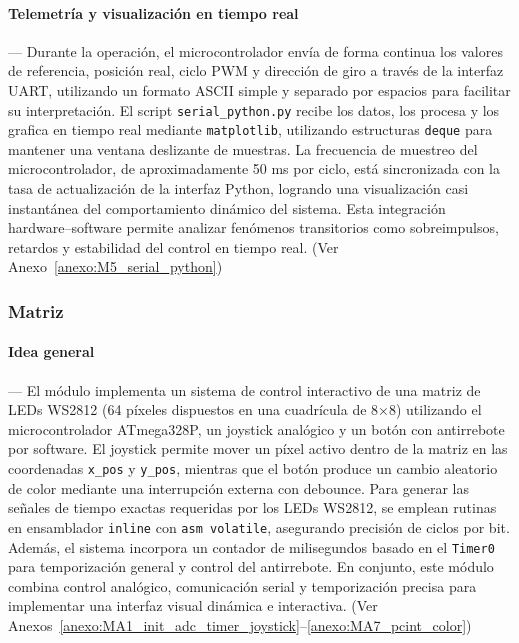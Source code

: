 \vspace{1em}

\paragraph*{\textbf{Telemetría y visualización en tiempo real}}---
Durante la operación, el microcontrolador envía de forma continua los valores de referencia, posición real, ciclo PWM y dirección de giro a través de la interfaz UART, utilizando un formato ASCII simple y separado por espacios para facilitar su interpretación. El script \texttt{serial\_python.py} recibe los datos, los procesa y los grafica en tiempo real mediante \texttt{matplotlib}, utilizando estructuras \texttt{deque} para mantener una ventana deslizante de muestras. La frecuencia de muestreo del microcontrolador, de aproximadamente 50 ms por ciclo, está sincronizada con la tasa de actualización de la interfaz Python, logrando una visualización casi instantánea del comportamiento dinámico del sistema. Esta integración hardware–software permite analizar fenómenos transitorios como sobreimpulsos, retardos y estabilidad del control en tiempo real. (Ver Anexo~\ref{anexo:M5_serial_python})



\vspace{1em}
\subsubsection{\textbf{Matriz}}

\paragraph*{\textbf{Idea general}}---
El módulo implementa un sistema de control interactivo de una matriz de LEDs WS2812 (64 píxeles dispuestos en una cuadrícula de 8×8) utilizando el microcontrolador ATmega328P, un joystick analógico y un botón con antirrebote por software. El joystick permite mover un píxel activo dentro de la matriz en las coordenadas \texttt{x\_pos} y \texttt{y\_pos}, mientras que el botón produce un cambio aleatorio de color mediante una interrupción externa con debounce. Para generar las señales de tiempo exactas requeridas por los LEDs WS2812, se emplean rutinas en ensamblador \texttt{inline} con \texttt{asm volatile}, asegurando precisión de ciclos por bit. Además, el sistema incorpora un contador de milisegundos basado en el \texttt{Timer0} para temporización general y control del antirrebote. En conjunto, este módulo combina control analógico, comunicación serial y temporización precisa para implementar una interfaz visual dinámica e interactiva. (Ver Anexos~\ref{anexo:MA1_init_adc_timer_joystick}–\ref{anexo:MA7_pcint_color})

